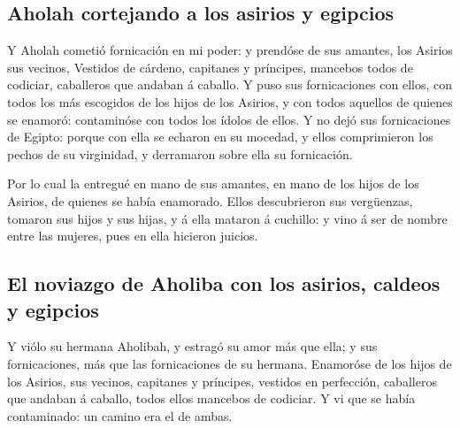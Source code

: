 \hypertarget{aholah-cortejando-a-los-asirios-y-egipcios}{%
\subsection{Aholah cortejando a los asirios y
egipcios}\label{aholah-cortejando-a-los-asirios-y-egipcios}}

 Y Aholah cometió fornicación en mi poder: y prendóse de
sus amantes, los Asirios sus vecinos,  Vestidos de
cárdeno, capitanes y príncipes, mancebos todos de codiciar, caballeros
que andaban á caballo.  Y puso sus fornicaciones con
ellos, con todos los más escogidos de los hijos de los Asirios, y con
todos aquellos de quienes se enamoró: contaminóse con todos los ídolos
de ellos.  Y no dejó sus fornicaciones de Egipto: porque
con ella se echaron en su mocedad, y ellos comprimieron los pechos de su
virginidad, y derramaron sobre ella su fornicación.

 Por lo cual la entregué en mano de sus amantes, en mano
de los hijos de los Asirios, de quienes se había enamorado.
 Ellos descubrieron sus vergüenzas, tomaron sus hijos y
sus hijas, y á ella mataron á cuchillo: y vino á ser de nombre entre las
mujeres, pues en ella hicieron juicios.

\hypertarget{el-noviazgo-de-aholiba-con-los-asirios-caldeos-y-egipcios}{%
\subsection{El noviazgo de Aholiba con los asirios, caldeos y
egipcios}\label{el-noviazgo-de-aholiba-con-los-asirios-caldeos-y-egipcios}}

 Y viólo su hermana Aholibah, y estragó su amor más que
ella; y sus fornicaciones, más que las fornicaciones de su hermana.
 Enamoróse de los hijos de los Asirios, sus vecinos,
capitanes y príncipes, vestidos en perfección, caballeros que andaban á
caballo, todos ellos mancebos de codiciar.  Y vi que se
había contaminado: un camino era el de ambas.

